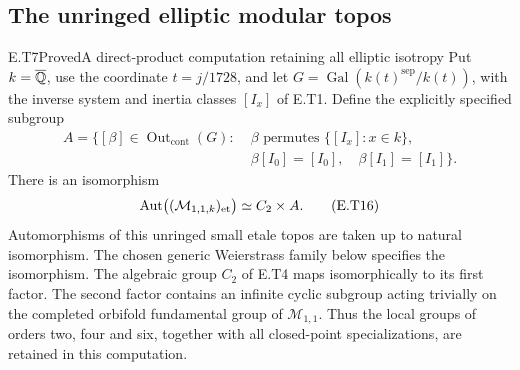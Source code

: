\subsection{The unringed elliptic modular topos}

\begin{result}{E.T7}{Proved}{A direct-product computation retaining all elliptic isotropy}
Put $k=\overline{\mathbb Q}$, use the coordinate $t=j/1728$, and
let $G=\operatorname{Gal}(k(t)^{\mathrm{sep}}/k(t))$, with
the inverse system and inertia classes $[I_x]$ of E.T1.
Define the explicitly specified subgroup
\[
 \begin{split}
 A=\{[\beta]\in\operatorname{Out}_{\mathrm{cont}}(G):\;&
 \beta\text{ permutes }\{[I_x]:x\in k\},\\
 &\beta[I_0]=[I_0],\quad\beta[I_1]=[I_1]\}.
 \end{split}
 \tag{E.T15}
\]
There is an isomorphism
\[
 \operatorname{Aut}\bigl((\mathcal M_{1,1,k})_{\mathrm{et}}\bigr)
                \simeq C_2\times A.                         \tag{E.T16}
\]
Automorphisms of this unringed small etale topos are taken
up to natural isomorphism.  The chosen generic Weierstrass
family below specifies the isomorphism.  The algebraic
group $C_2$ of E.T4 maps isomorphically to its first
factor.  The second factor contains an infinite cyclic
subgroup acting trivially on the completed orbifold
fundamental group of $\mathcal M_{1,1}$.  Thus the local
groups of orders two, four and six, together with all
closed-point specializations, are retained in this
computation.
\end{result}

